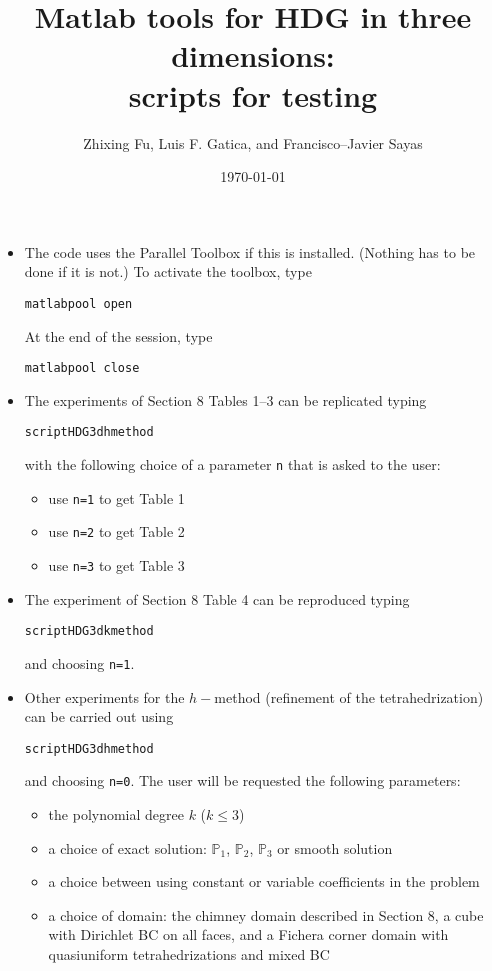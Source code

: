 \documentclass[12pt,twoside,english,a4paper]{article}
\title{Matlab tools for HDG in three dimensions:\\ scripts for testing}
\date{\today}
\author{Zhixing Fu, Luis F. Gatica, and Francisco--Javier Sayas}
\numberwithin{equation}{section}
\begin{document}
\maketitle

\begin{itemize}
\item The code uses the Parallel Toolbox if this is installed. (Nothing has to be done if it is not.) To activate the toolbox, type
\begin{verbatim}
matlabpool open
\end{verbatim}
At the end of the session, type
\begin{verbatim}
matlabpool close
\end{verbatim}
\item The experiments of Section 8 Tables 1--3 can be replicated typing
\begin{verbatim}
scriptHDG3dhmethod
\end{verbatim}
with the following choice of a parameter {\tt n} that is asked to the user:
\begin{itemize}
\item use {\tt n=1} to get Table 1
\item use {\tt n=2} to get Table 2
\item use {\tt n=3} to get Table 3
\end{itemize}
\item The experiment of Section 8 Table 4 can be reproduced typing 
\begin{verbatim}
scriptHDG3dkmethod
\end{verbatim}
and choosing {\tt n=1}.
\item Other experiments for the $h-$method (refinement of the tetrahedrization) can be carried out using 
\begin{verbatim}
scriptHDG3dhmethod
\end{verbatim}
and choosing {\tt n=0}. The user will be requested the following parameters:
\begin{itemize}
\item the polynomial degree $k$ ($k\le 3$)
\item a choice of exact solution:  $\mathbb P_1$, $\mathbb P_2$, $\mathbb P_3$ or smooth solution
\item a choice between using constant or variable coefficients in the problem
\item a choice of domain: the chimney domain described in Section 8,  a cube with Dirichlet BC on all faces, and a Fichera corner domain with quasiuniform tetrahedrizations and mixed BC
\end{itemize}


\end{itemize}
\end{document}
